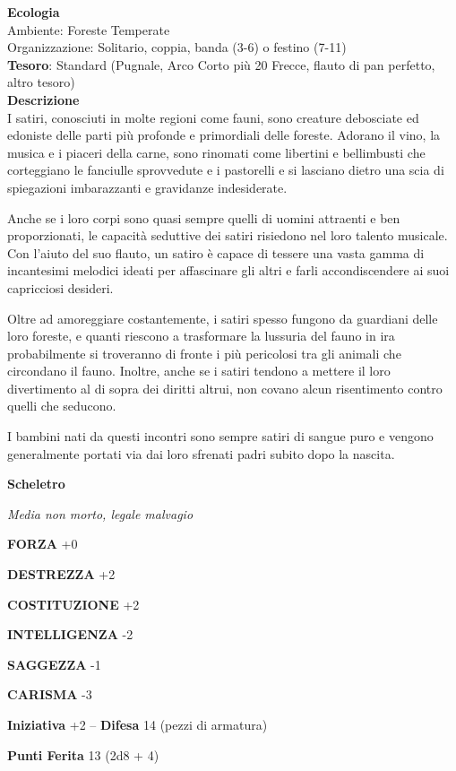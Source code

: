 \begin{multicols}{2}
	\textbf{Ecologia}\\
	Ambiente: Foreste Temperate\\
	Organizzazione: Solitario, coppia, banda (3-6) o festino (7-11)\\
	\textbf{Tesoro}: Standard (Pugnale, Arco Corto più 20 Frecce, flauto di pan perfetto, altro tesoro)\\
	\textbf{Descrizione}\\
	I satiri, conosciuti in molte regioni come fauni, sono creature debosciate ed edoniste delle parti più profonde e primordiali delle foreste. Adorano il vino, la musica e i piaceri della carne, sono rinomati come libertini e bellimbusti che corteggiano le fanciulle sprovvedute e i pastorelli e si lasciano dietro una scia di spiegazioni imbarazzanti e gravidanze indesiderate.

	Anche se i loro corpi sono quasi sempre quelli di uomini attraenti e ben proporzionati, le capacità seduttive dei satiri risiedono nel loro talento musicale. Con l'aiuto del suo flauto, un satiro è capace di tessere una vasta gamma di incantesimi melodici ideati per affascinare gli altri e farli accondiscendere ai suoi capricciosi desideri.

	Oltre ad amoreggiare costantemente, i satiri spesso fungono da guardiani delle loro foreste, e quanti riescono a trasformare la lussuria del fauno in ira probabilmente si troveranno di fronte i più pericolosi tra gli animali che circondano il fauno. Inoltre, anche se i satiri tendono a mettere il loro divertimento al di sopra dei diritti altrui, non covano alcun risentimento contro quelli che seducono.

	I bambini nati da questi incontri sono sempre satiri di sangue puro e vengono generalmente portati via dai loro sfrenati padri subito dopo la nascita.


	\medskip{}\textbf{Scheletro}

	\textit{Media non morto, legale malvagio}

	\textbf{FORZA} +0

	\textbf{DESTREZZA} +2

	\textbf{COSTITUZIONE} +2

	\textbf{INTELLIGENZA} -2

	\textbf{SAGGEZZA} -1

	\textbf{CARISMA} -3

	\textbf{Iniziativa} +2 -- \textbf{Difesa} 14 (pezzi di armatura)

	\textbf{Punti Ferita} 13 (2d8 + 4)


\end{multicols}
